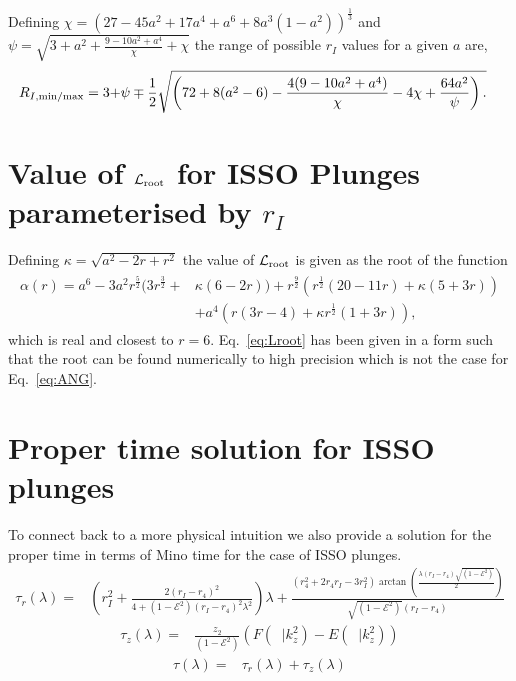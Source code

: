\documentclass[12pt, amsmath]{revtex4-2}
\newcommand\lam{\lambda}
\newcommand\EN{\mathcal{E}}
\newcommand\ANG{\mathcal{L}}
\DeclareMathOperator{\amz}{\xi_z}
\begin{document}
Defining $\chi =(27-45a^2+17a^4+a^6+8 a^3(1-a^2))^{\frac{1}{3}} $ and $\psi = \sqrt{3 + a^2 + \frac{9-10a^2+a^4}{\chi} +\chi} $ the range of possible $r_{I}$ values for a given $a$ are,
\begin{align}\label{eq:RIminmax}
    R_{I,\rm min/max} = 3 + &\psi \mp \frac{1}{2}\sqrt{\left( 72+8(a^2-6)-\frac{4(9-10a^2+a^4)}{\chi}-4\chi+\frac{64a^2}{\psi} \right).}
\end{align}

\section{Value of $\ANG_{\rm root}$ for ISSO Plunges parameterised by $r_I$}\label{app:Lroot}
Defining $\kappa = \sqrt{a^2-2r+r^2}$ the value of $\ANG_{\rm root}$ is given as the root of the function 
\begin{align}
\begin{aligned}\label{eq:Lroot}
        \alpha(r) = a^6 - 3 a^2 r^{\frac{5}{2}}( 3 r^{\frac{3}{2}}+  &\kappa( 6 - 2r))+r^{\frac{9}{2}}(r^{\frac{1}{2}}(20 -11r) + \kappa(5 + 3r))\\
        &+ a^4( r(3r -4) + \kappa r^{\frac{1}{2}}(1 + 3r) ),  
\end{aligned}
\end{align}
which is real and closest to $r = 6$. Eq.~\eqref{eq:Lroot} has been given in a form such that the root can be found numerically to high precision which is not the case for Eq.~\eqref{eq:ANG}.

\section{Proper time solution for ISSO plunges}\label{app:ISSOproper}

To connect back to a more physical intuition we also provide a solution for the proper time in terms of Mino time for the case of ISSO plunges.
\begin{align}
    \tau_r(\lam) =&\left(r_I^2+\frac{2(r_I-r_4)^2}{4 + (1-\EN^2)(r_I-r_4)^2\lam^2}\right)\lam+ \frac{ (r_4^2 +2r_4r_I-3r_I^2)\arctan(\frac{\lam(r_I-r_4)\sqrt{(1-\EN^2)}}{2})}{\sqrt{(1-\EN^2)}(r_I-r_4)}
\end{align}
\begin{align}
    \tau_z(\lam) =&\frac{ z_2 }{(1-\EN^2)}\left( F(\amz|k_z^2 )-E(\amz|k_z^2)\right)
\end{align}
\begin{align}
    \tau(\lam) =& \tau_r(\lam)+ \tau_z(\lam)
\end{align}
\end{document}
